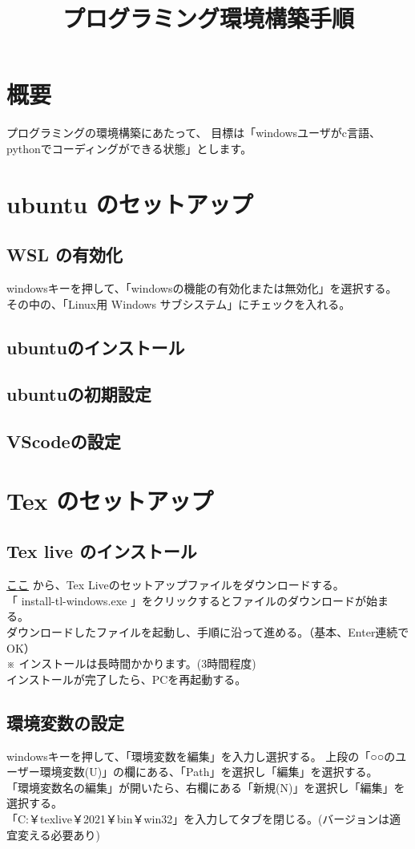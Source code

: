 \documentclass[a4paper]{jsarticle}
\author{}
\title{プログラミング環境構築手順}
\date{}
\begin{document}
\maketitle

\section*{\large 概要}
プログラミングの環境構築にあたって、
目標は「windowsユーザがc言語、pythonでコーディングができる状態」とします。
\section{\large ubuntu のセットアップ}
\subsection{WSL の有効化}
windowsキーを押して、「windowsの機能の有効化または無効化」を選択する。
その中の、「Linux用 Windows サブシステム」にチェックを入れる。

\subsection{ubuntuのインストール}
\subsection{ubuntuの初期設定}
\subsection{VScodeの設定}
\section{\large Tex のセットアップ}
\subsection{Tex live のインストール}
\textcolor{blue}{\href{http://www.tug.org/texlive/acquire-netinstall.html}{ここ}} から、Tex Liveのセットアップファイルをダウンロードする。\\
「 install-tl-windows.exe 」をクリックするとファイルのダウンロードが始まる。\\
ダウンロードしたファイルを起動し、手順に沿って進める。（基本、Enter連続でOK）\\
※ インストールは長時間かかります。(3時間程度)\\
インストールが完了したら、PCを再起動する。
\subsection{環境変数の設定}
windowsキーを押して、「環境変数を編集」を入力し選択する。
上段の「○○のユーザー環境変数(U)」の欄にある、「Path」を選択し「編集」を選択する。\\
「環境変数名の編集」が開いたら、右欄にある「新規(N)」を選択し「編集」を選択する。\\
「C:￥texlive￥2021￥bin￥win32」を入力してタブを閉じる。(バージョンは適宜変える必要あり)
\end{document}
